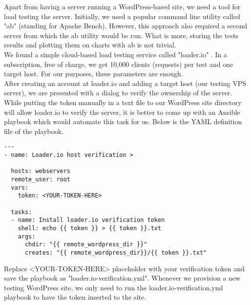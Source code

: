 Apart from having a server running a WordPress-based site, we need a tool for load testing the server. Initially, we used a popular command line utility called "ab" (standing for Apache Bench). However, this approach also required a second server from which the ab utility would be run. What is more, storing the tests results and plotting them on charts with ab is not trivial. \\

We found a simple cloud-based \gls{load testing} service called "loader.io" \cite{Loader.io:main_site}. In a subscription, free of charge, we get 10,000 clients (requests) per test and one target host. For our purposes, these parameters are enough. \\

After creating an account at loader.io and adding a target host (our testing VPS server), we are presented with a dialog to verify the ownership of the server. While putting the token manually in a text file to our WordPress site directory will allow loader.io to verify the server, it is better to come up with an Ansible playbook which would automate this task for us. Below is the YAML definition file of the playbook.

\begin{lstlisting}
---
- name: Loader.io host verification >
 
  hosts: webservers
  remote_user: root
  vars:
    token: <YOUR-TOKEN-HERE>
 
  tasks:
  - name: Install loader.io verification token
    shell: echo {{ token }} > {{ token }}.txt
    args:
      chdir: "{{ remote_wordpress_dir }}"
      creates: "{{ remote_wordpress_dir}}/{{ token }}.txt"
\end{lstlisting}

Replace <YOUR-TOKEN-HERE> placeholder with your verification token and save the playbook as "loader.io-verification.yml". Whenever we provision a new testing WordPress site, we only need to run the loader.io-verification.yml playbook to have the token inserted to the site.
